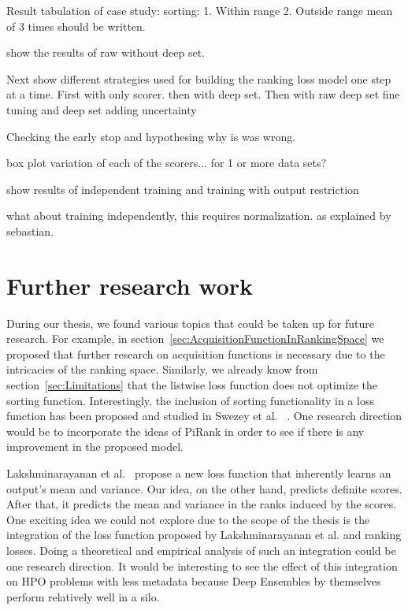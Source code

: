\documentclass[12pt, twoside, ngerman]{report}
\begin{document}
Result tabulation of case study: sorting:
1.  Within range
2.   Outside range 
mean of 3 times should be written.

show the results of raw without deep set.

Next show different strategies used for building the ranking loss model one step at a time.
First with only scorer.
then with deep set.
Then with raw deep set
fine tuning and deep set
adding uncertainty

Checking the early stop and hypothesing why is was wrong.

box plot variation of each of the scorers... for 1 or more data sets?

show results of independent training and training with output restriction

what about training independently,   this requires normalization. 
as explained by sebastian.
\fi

\section{Further research work}

During our thesis, we found various topics that could be taken up for future research. For example, in section~\ref{sec:AcquisitionFunctionInRankingSpace} we proposed that further research on acquisition functions is necessary due to the intricacies of the ranking space. Similarly, we already know from section~\ref{sec:Limitations} that the listwise loss function does not optimize the sorting function.
Interestingly, the inclusion of sorting functionality in a loss function has been proposed and studied in Swezey et al. ~\cite{PiRank}.
One research direction would be to incorporate the ideas of PiRank in order to see if there is any improvement in the proposed model.

Lakshminarayanan et al.~\cite{DeepEnsemblePaper} propose a new loss function that inherently learns an output's mean and variance. Our idea, on the other hand, predicts definite scores. After that, it predicts the mean and variance in the ranks induced by the scores. One exciting idea we could not explore due to the scope of the thesis is the integration of the loss function proposed by Lakshminarayanan et al. and ranking losses. Doing a theoretical and empirical analysis of such an integration could be one research direction.
It would be interesting to see the effect of this integration on HPO problems with less metadata because Deep Ensembles by themselves perform relatively well in a silo.
\end{document}
